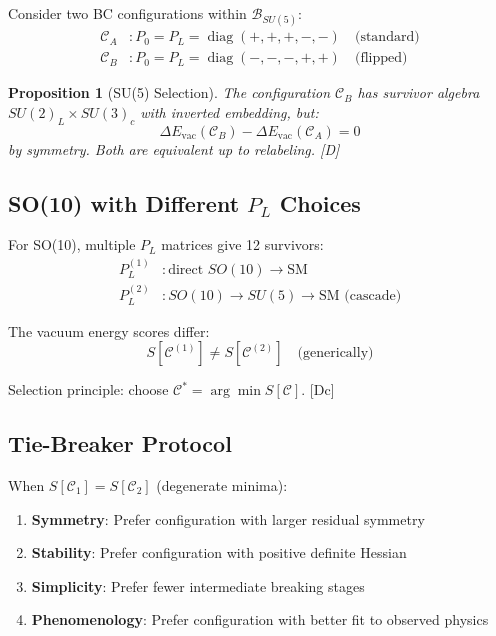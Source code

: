 \documentclass[11pt,a4paper]{article}
\newtheorem{proposition}[theorem]{Proposition}
\newcommand{\tagD}{\textcolor{blue!70!black}{[D]}}
\newcommand{\tagDc}{\textcolor{blue!50!black}{[Dc]}}
\DeclareMathOperator{\diag}{diag}
\begin{document}
Consider two BC configurations within $\mathcal{B}_{SU(5)}$:
\begin{align}
\label{eq:su5-config-A}
\mathcal{C}_A &: P_0 = P_L = \diag(+,+,+,-,-) \quad \text{(standard)} \\
\label{eq:su5-config-B}
\mathcal{C}_B &: P_0 = P_L = \diag(-,-,-,+,+) \quad \text{(flipped)}
\end{align}

\begin{proposition}[SU(5) Selection]
\label{prop:su5-selection}
The configuration $\mathcal{C}_B$ has survivor algebra $SU(2)_L \times SU(3)_c$
with inverted embedding, but:
\begin{equation}
\label{eq:su5-selection-result}
\Delta E_{\text{vac}}(\mathcal{C}_B) - \Delta E_{\text{vac}}(\mathcal{C}_A) = 0
\end{equation}
by symmetry. Both are equivalent up to relabeling. \tagD
\end{proposition}

\subsection{SO(10) with Different $P_L$ Choices}

For SO(10), multiple $P_L$ matrices give 12 survivors:
\begin{align}
\label{eq:so10-PL-choice1}
P_L^{(1)} &: \text{direct } SO(10) \to \text{SM} \\
\label{eq:so10-PL-choice2}
P_L^{(2)} &: SO(10) \to SU(5) \to \text{SM} \text{ (cascade)}
\end{align}

The vacuum energy scores differ:
\begin{equation}
\label{eq:so10-score-diff}
S[\mathcal{C}^{(1)}] \neq S[\mathcal{C}^{(2)}] \quad \text{(generically)}
\end{equation}

Selection principle: choose $\mathcal{C}^* = \arg\min S[\mathcal{C}]$. \tagDc

\subsection{Tie-Breaker Protocol}

When $S[\mathcal{C}_1] = S[\mathcal{C}_2]$ (degenerate minima):
\begin{enumerate}
    \item \textbf{Symmetry}: Prefer configuration with larger residual symmetry
    \item \textbf{Stability}: Prefer configuration with positive definite Hessian
    \item \textbf{Simplicity}: Prefer fewer intermediate breaking stages
    \item \textbf{Phenomenology}: Prefer configuration with better fit to observed physics
\end{enumerate}
\end{document}
